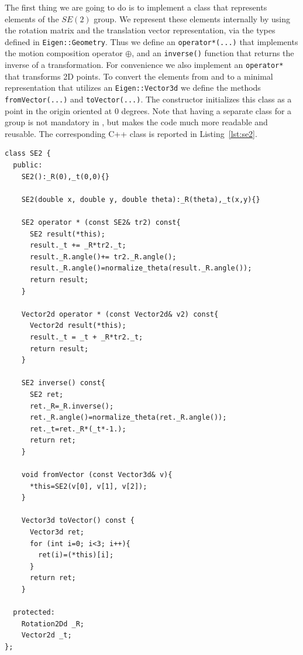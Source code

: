 \documentclass[a4paper]{article}
\begin{document}
The first thing we are going to do is to implement a class that
represents elements of the $SE(2)$ group. We represent these elements
internally by using the rotation matrix and the translation vector
representation, via the types defined in \verb+Eigen::Geometry+.  Thus
we define an \verb+operator*(...)+ that implements the motion composition
operator $\oplus$, and an \verb+inverse()+ function that returns the inverse of
a transformation. For convenience we also implement an
\verb+operator*+ that transforms 2D points. To convert the elements
from and to a minimal representation that utilizes an \verb+Eigen::Vector3d+
we define the methods \verb+fromVector(...)+ and \verb+toVector(...)+.
The constructor initializes this class as a point in the origin
oriented at 0 degrees.  Note that having a separate class for a group
is not mandatory in \gopt, but makes the code much more readable and
reusable. The corresponding C++ class is reported in
Listing~\ref{lst:se2}.
\begin{lstlisting}[float,label=lst:se2,caption=\text{Helper class to represent $SE(2)$}.]
class SE2 {
  public:
    SE2():_R(0),_t(0,0){}

    SE2(double x, double y, double theta):_R(theta),_t(x,y){}

    SE2 operator * (const SE2& tr2) const{
      SE2 result(*this);
      result._t += _R*tr2._t;
      result._R.angle()+= tr2._R.angle();
      result._R.angle()=normalize_theta(result._R.angle());
      return result;
    }

    Vector2d operator * (const Vector2d& v2) const{
      Vector2d result(*this);
      result._t = _t + _R*tr2._t;
      return result;
    }

    SE2 inverse() const{
      SE2 ret;
      ret._R=_R.inverse();
      ret._R.angle()=normalize_theta(ret._R.angle());
      ret._t=ret._R*(_t*-1.);
      return ret;
    }

    void fromVector (const Vector3d& v){
      *this=SE2(v[0], v[1], v[2]);
    }

    Vector3d toVector() const {
      Vector3d ret;
      for (int i=0; i<3; i++){
        ret(i)=(*this)[i];
      }
      return ret;
    }

  protected:
    Rotation2Dd _R;
    Vector2d _t;
};
\end{lstlisting}
\end{document}
